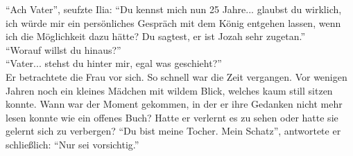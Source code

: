 ``Ach Vater'', seufzte Ilia: ``Du kennst mich nun 25 Jahre... glaubst du wirklich, ich würde mir 
ein persönliches Gespräch mit dem König entgehen lassen, wenn ich die Möglichkeit dazu hätte? Du 
sagtest, er ist Jozah sehr zugetan.''\\
``Worauf willst du hinaus?''\\
``Vater... stehst du hinter mir, egal was geschieht?''\\
Er betrachtete die Frau vor sich. So schnell war die Zeit vergangen. Vor wenigen Jahren noch ein 
kleines Mädchen mit wildem Blick, welches kaum still sitzen konnte. Wann war der Moment gekommen, 
in der er ihre Gedanken nicht mehr lesen konnte wie ein offenes Buch? Hatte er verlernt es zu sehen 
oder hatte sie gelernt sich zu verbergen? ``Du bist meine Tocher. Mein Schatz'', antwortete er 
schließlich: ``Nur sei vorsichtig.''\\

